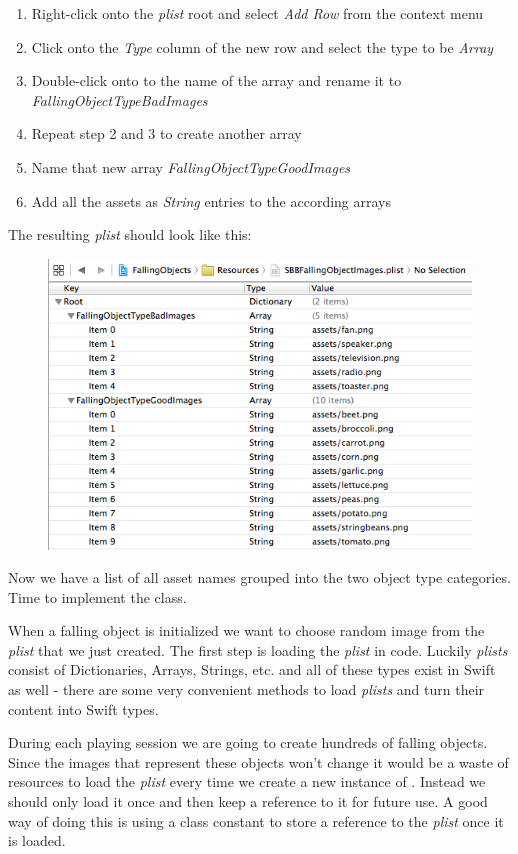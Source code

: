 \begin{leftbar}
\begin{enumerate}
  \item Right-click onto the \textit{plist} root and select \textit{Add Row}
  from the context menu
  \item Click onto the \textit{Type} column of the new row and select the type
  to be \textit{Array}
  \item Double-click onto to the name of the array and rename it to
  \textit{FallingObjectTypeBadImages}
  \item Repeat step 2 and 3 to create another array
  \item Name that new array \textit{FallingObjectTypeGoodImages}
  \item Add all the assets as \textit{String} entries to the according arrays
\end{enumerate}
The resulting \textit{plist} should look like this:
\begin{figure}[H]
    \centering
    \includegraphics[width=0.7\linewidth]{images/Chapter2/plist_setup.png}
\end{figure}
\end{leftbar}

Now we have a list of all asset names grouped into the two object type
categories. Time to implement the  class.

When a falling object is initialized we want to
choose random image from the \textit{plist} that we just created.
The first step is loading the \textit{plist} in code. Luckily \textit{plists}
consist of Dictionaries, Arrays, Strings, etc. and all of these types exist in
Swift as well - there are some very convenient methods to load
\textit{plists} and turn their content into Swift types. 

During each playing session we are going to create hundreds of
falling objects. Since the images that represent these objects won't change it
would be a waste of resources to load the \textit{plist} every time we create a
new instance of . Instead we should only load it
once and then keep a reference to it for future use. A good way of doing this is
using a class constant to store a reference to the \textit{plist} once
it is loaded.

